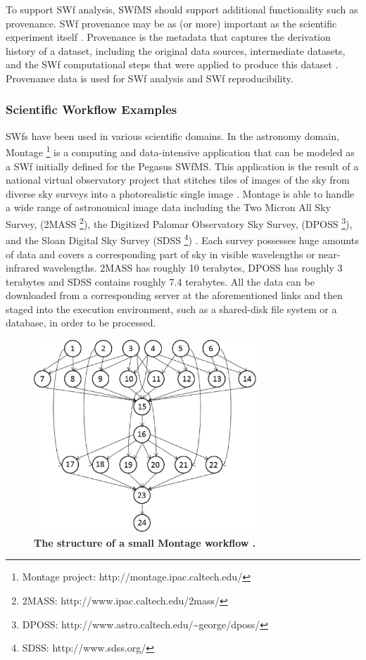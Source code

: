 To support SWf analysis, SWfMS should support additional functionality such as provenance. 
SWf provenance may be as (or more) important as the scientific
experiment itself \cite{Freire2008}.
Provenance is the metadata that captures the derivation history of a dataset, including the original data sources, intermediate datasets, and the SWf computational steps that were applied to produce this dataset \cite{Costa2013,Oliveira2012a,A.R.Gonccalves2012,Horta2012}.
Provenance data is used for SWf analysis and SWf reproducibility.

\subsubsection{Scientific Workflow Examples}
\label{subsubsec:SWE}

SWfs have been used in various scientific domains.
In the astronomy domain, Montage%
\footnote{Montage project: http://montage.ipac.caltech.edu/%
} is a computing and data-intensive application that can be modeled
as a SWf initially defined for the Pegasus SWfMS. This
application is the result of a national virtual observatory project
that stitches tiles of images of the sky from diverse sky surveys
into a photorealistic single image \cite{Deelman2008}. Montage is
able to handle a wide range of astronomical image data
including the Two Micron All Sky Survey, (2MASS%
\footnote{2MASS: http://www.ipac.caltech.edu/2mass/%
}), the Digitized Palomar Observatory Sky Survey, (DPOSS%
\footnote{DPOSS: http://www.astro.caltech.edu/\textasciitilde{}george/dposs/%
}), and the Sloan Digital Sky Survey (SDSS%
\footnote{SDSS: http://www.sdss.org/%
}) \cite{Jacob2009}. Each survey possesses huge amounts of data and
covers a corresponding part of sky in visible wavelengths or near-infrared
wavelengths. 2MASS has roughly 10 terabytes, DPOSS has roughly 3 terabytes
and SDSS contains roughly 7.4 terabytes. All the data can be downloaded
from a corresponding server at the aforementioned links and then
staged into the execution environment, such
as a shared-disk file system or a database, in order to be processed.

\begin{figure}
\centering{}
\captionsetup{justification=centering}
\includegraphics[width=84mm]{figures/1}\caption{\textbf{The structure of a small Montage workflow \cite{Singh2008}. }}
\label{fig:Sf1} 
\end{figure}

